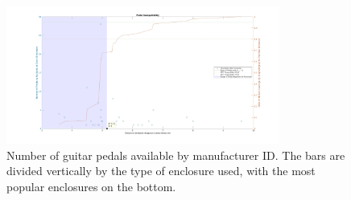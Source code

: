 \documentclass{article}
\begin{document}
	\begin{figure}
		\centering
		\includegraphics[width = 0.8\textwidth]{PR4Images/PedalsAvailable.jpg}
		\caption{Number of guitar pedals available by manufacturer ID.  The bars are divided vertically by the type of enclosure used, with the most popular enclosures on the bottom.}
		\label{fig:pedalsAvailable}
	\end{figure}
\end{document}
